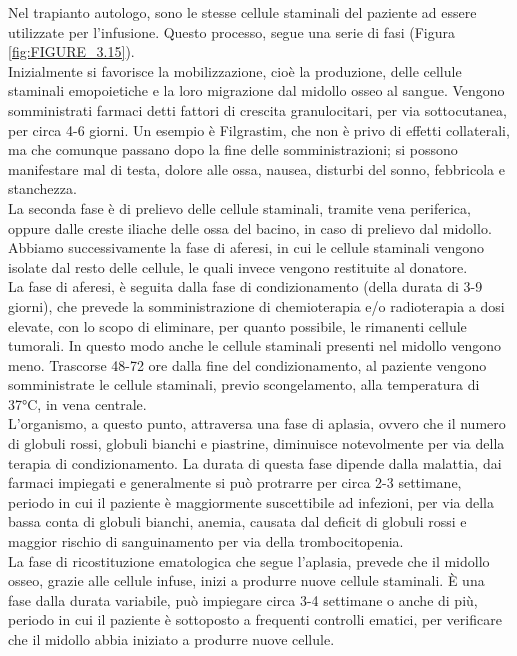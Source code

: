 Nel trapianto autologo, sono le stesse cellule staminali del paziente ad essere utilizzate per l’infusione. 
Questo processo, segue una serie di fasi (Figura \ref{fig:FIGURE_3.15}).\\
Inizialmente si favorisce la mobilizzazione, cioè la produzione, delle cellule staminali emopoietiche e la 
loro migrazione dal midollo osseo al sangue. Vengono somministrati farmaci detti fattori di crescita granulocitari, 
per via sottocutanea, per circa 4-6 giorni\cite{TRAPIANTO}. Un esempio è Filgrastim, che non è privo di effetti 
collaterali, ma che comunque passano dopo la fine delle somministrazioni; si possono manifestare mal di testa, 
dolore alle ossa, nausea, disturbi del sonno, febbricola e stanchezza\cite{STEMCELLS}.\\
La seconda fase è di prelievo delle cellule staminali, tramite vena periferica, oppure dalle creste iliache delle 
ossa del bacino, in caso di prelievo dal midollo.\\ 
Abbiamo successivamente la fase di aferesi, in cui le cellule staminali vengono isolate dal resto delle cellule, 
le quali invece vengono restituite al donatore.\\ 
La fase di aferesi, è seguita dalla fase di condizionamento (della durata di 3-9 giorni), che prevede la 
somministrazione di chemioterapia e/o radioterapia a dosi elevate, con lo scopo di eliminare, 
per quanto possibile, le rimanenti cellule tumorali. In questo modo anche 
le cellule staminali presenti nel midollo vengono meno. Trascorse 48-72 ore dalla fine del condizionamento, 
al paziente vengono somministrate le cellule staminali, previo scongelamento, alla temperatura di 37°C, 
in vena centrale\cite{TRAPIANTO}.\\
L’organismo, a questo punto, attraversa una fase di aplasia, ovvero che il numero di globuli rossi, globuli bianchi e 
piastrine, diminuisce notevolmente per via della terapia di condizionamento. La durata di questa fase dipende 
dalla malattia, dai farmaci impiegati e generalmente si può protrarre per circa 2-3 settimane\cite{TRAPIANTO}, 
periodo in cui il paziente è maggiormente suscettibile ad infezioni, per via della bassa conta di globuli bianchi, 
anemia, causata dal deficit di globuli rossi e maggior rischio di sanguinamento per via della trombocitopenia\cite{LLSBLOOD}.\\
La fase di ricostituzione ematologica che segue l’aplasia, prevede che il midollo osseo, grazie alle cellule infuse, 
inizi a produrre nuove cellule staminali\cite{TRAPIANTO}.
È una fase dalla durata variabile, può impiegare circa 3-4 settimane o anche di più, periodo in cui il paziente 
è sottoposto a frequenti controlli ematici, per verificare che il midollo abbia iniziato a produrre nuove cellule\cite{LLSBLOOD}.\\

